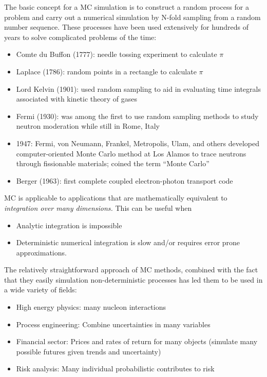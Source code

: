 \documentclass[12pt]{article}
\newlength{\up}
\begin{document}
The basic concept for a MC simulation is to construct a random process for a problem and carry out a numerical simulation by N-fold sampling from a random number sequence.
These processes have been used extensively for hundreds of years to solve complicated problems of the time:

\begin{itemize}
  \item Comte du Buffon (1777): needle tossing experiment to calculate $\pi$
  \item Laplace (1786): random points in a rectangle to calculate $\pi$
  \item Lord Kelvin (1901): used random sampling to aid in evaluating time integrals associated with kinetic theory of gases
  \item Fermi (1930): was among the first to use random sampling methods to study neutron moderation while still in Rome, Italy
  \item 1947: Fermi, von Neumann, Frankel, Metropolis, Ulam, and others developed computer-oriented Monte Carlo method at Los Alamos to trace neutrons through fissionable materials; coined the term “Monte Carlo”
  \item Berger (1963): first complete coupled electron-photon transport code
\end{itemize}

MC is applicable to applications that are mathematically equivalent to \textit{integration over many dimensions.}
This can be useful when

\begin{itemize}
  \item Analytic integration is impossible
  \item Deterministic numerical integration is slow and/or requires error prone approximations.
\end{itemize}

The relatively straightforward approach of MC methods, combined with the fact that they easily simulation non-deterministic processes has led them to be used in a wide variety of fields:

\begin{itemize}
  \item High energy physics: many nucleon interactions
  \item Process engineering: Combine uncertainties in many variables
  \item Financial sector: Prices and rates of return for many objects (simulate many possible futures given trends and uncertainty)
  \item Risk analysis: Many individual probabilistic contributes to risk
\end{itemize}
\end{document}
